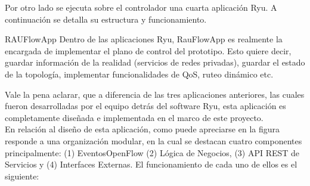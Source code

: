 Por otro lado se ejecuta sobre el controlador una cuarta aplicaci\'on Ryu. A continuaci\'on se detalla su estructura y funcionamiento.

\begin{subsubsection}{RAUFlowApp}
Dentro de las aplicaciones Ryu, RauFlowApp es realmente la encargada de implementar el plano de control  del prototipo. Esto quiere decir, guardar informaci\'on de la realidad (servicios de redes privadas), guardar el estado de la topolog\'ia, implementar funcionalidades de QoS, ruteo din\'amico etc. 


Vale la pena aclarar, que a diferencia de las tres aplicaciones anteriores, las cuales fueron desarrolladas por el equipo detrás del software Ryu, esta aplicaci\'on es completamente diseñada e implementada en el marco de este proyecto.\\

En relaci\'on al diseño de esta aplicaci\'on, como puede apreciarse en la figura responde a una organización modular, en la cual se destacan cuatro componentes principalmente: (1) EventosOpenFlow (2) L\'ogica de Negocios, (3) API REST de Servicios y (4) Interfaces Externas. El funcionamiento de cada uno de ellos es el siguiente:
  





\end{subsubsection}
